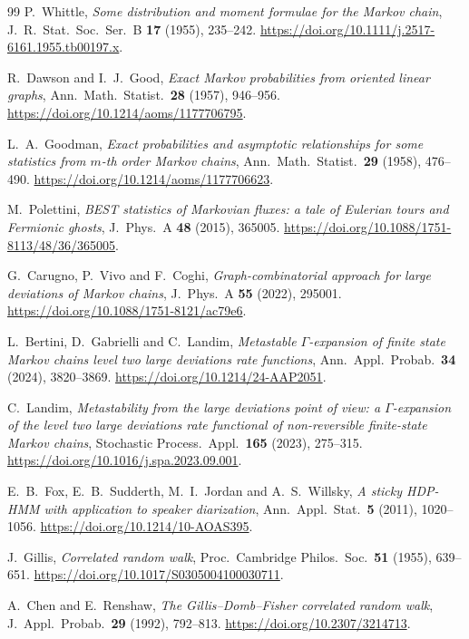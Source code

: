 \documentclass[11pt]{article}
\theoremstyle{definition}
\theoremstyle{remark}
\begin{document}
\begin{thebibliography}{99}
P.~Whittle, \emph{Some distribution and moment formulae for the Markov
chain}, J.~R.~Stat.~Soc.~Ser.~B \textbf{17} (1955), 235--242.
\url{https://doi.org/10.1111/j.2517-6161.1955.tb00197.x}.

R.~Dawson and I.~J.~Good, \emph{Exact Markov probabilities from oriented
linear graphs}, Ann.~Math.~Statist.~\textbf{28} (1957), 946--956.
\url{https://doi.org/10.1214/aoms/1177706795}.

L.~A.~Goodman, \emph{Exact probabilities and asymptotic relationships for
some statistics from $m$-th order Markov chains}, Ann.~Math.~Statist.~\textbf{29}
(1958), 476--490. \url{https://doi.org/10.1214/aoms/1177706623}.

M.~Polettini, \emph{BEST statistics of Markovian fluxes: a tale of Eulerian
tours and Fermionic ghosts}, J.~Phys.~A \textbf{48} (2015), 365005.
\url{https://doi.org/10.1088/1751-8113/48/36/365005}.

G.~Carugno, P.~Vivo and F.~Coghi, \emph{Graph-combinatorial approach for
large deviations of Markov chains}, J.~Phys.~A \textbf{55} (2022), 295001.
\url{https://doi.org/10.1088/1751-8121/ac79e6}.

L.~Bertini, D.~Gabrielli and C.~Landim, \emph{Metastable $\Gamma$-expansion
of finite state Markov chains level two large deviations rate functions},
Ann.~Appl.~Probab.~\textbf{34} (2024), 3820--3869.
\url{https://doi.org/10.1214/24-AAP2051}.

C.~Landim, \emph{Metastability from the large deviations point of view: a
$\Gamma$-expansion of the level two large deviations rate functional of
non-reversible finite-state Markov chains}, Stochastic Process.~Appl.~\textbf{165}
(2023), 275--315. \url{https://doi.org/10.1016/j.spa.2023.09.001}.

E.~B.~Fox, E.~B.~Sudderth, M.~I.~Jordan and A.~S.~Willsky, \emph{A sticky
HDP-HMM with application to speaker diarization}, Ann.~Appl.~Stat.~\textbf{5}
(2011), 1020--1056. \url{https://doi.org/10.1214/10-AOAS395}.

J.~Gillis, \emph{Correlated random walk}, Proc.~Cambridge Philos.~Soc.~\textbf{51}
(1955), 639--651. \url{https://doi.org/10.1017/S0305004100030711}.

A.~Chen and E.~Renshaw, \emph{The Gillis--Domb--Fisher correlated random
walk}, J.~Appl.~Probab.~\textbf{29} (1992), 792--813.
\url{https://doi.org/10.2307/3214713}.


\end{thebibliography}
\end{document}
